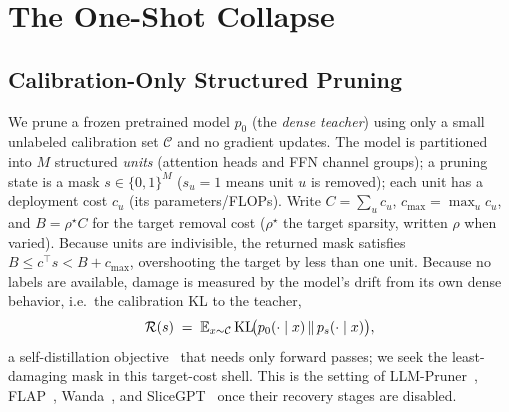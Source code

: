 \section{The One-Shot Collapse}
\label{sec:collapse}

\subsection{Calibration-Only Structured Pruning}
We prune a frozen pretrained model $p_0$ (the \emph{dense teacher}) using only a small unlabeled
calibration set $\mathcal{C}$ and no gradient updates. The model is partitioned into $M$ structured
\emph{units} (attention heads and FFN channel groups); a pruning state is a mask
$s\in\{0,1\}^M$ ($s_u{=}1$ means unit $u$ is removed); each unit has a deployment cost $c_u$ (its
parameters/FLOPs). 
Write $C = \sum_u c_u$, $c_{\max} = \max_u c_u$, and $B = \rho^\star C$ for the target removal cost ($\rho^\star$ the target sparsity, written $\rho$ when varied). Because units are indivisible, the returned mask satisfies $B \le c^\top s < B + c_{\max}$, overshooting the target by less than one unit.
Because no labels are available, damage is measured by the model's drift from its own
dense behavior, i.e.\ the calibration KL to the teacher,
\begin{equation}
\mathcal{R}(s) \;=\; \mathbb{E}_{x\sim\mathcal{C}}\,\mathrm{KL}\!\big(p_0(\cdot\mid x)\,\|\,p_s(\cdot\mid x)\big),
\label{eq:risk}
\end{equation}
a self-distillation objective~\citep{hinton2015distillation} that needs only forward passes; we seek the
least-damaging mask in this target-cost shell. This is the setting of
LLM-Pruner~\citep{ma2023llmpruner}, FLAP~\citep{an2024flap}, Wanda~\citep{sun2024wanda}, and
SliceGPT~\citep{ashkboos2024slicegpt} once their recovery stages are disabled.


